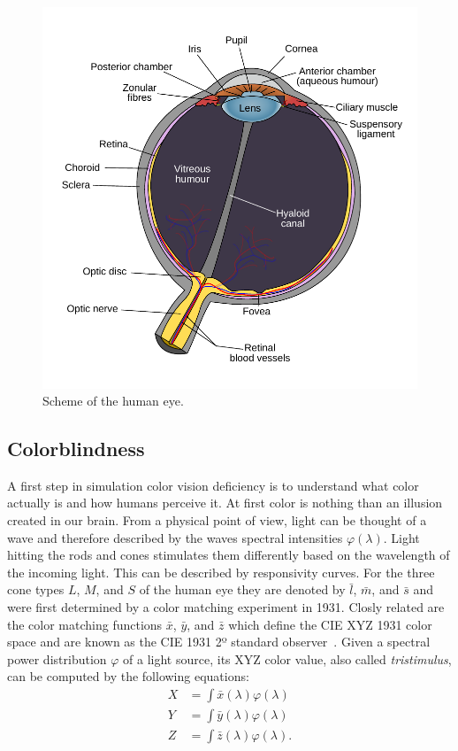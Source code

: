 \documentclass{sig-alternate-05-2015}
\begin{document}
\begin{figure}
    \centering
    \includegraphics[width=\columnwidth]{human_eye_scheme.pdf}
    \caption{Scheme of the human eye.}
    \label{fig:humaneye}
\end{figure}
%
%
\subsection{Colorblindness}
A first step in simulation color vision deficiency is to understand what color actually is and how humans perceive it.
At first color is nothing than an illusion created in our brain.
From a physical point of view, light can be thought of a wave and therefore described by the waves spectral intensities $\varphi(\lambda)$.
Light hitting the rods and cones stimulates them differently based on the wavelength of the incoming light.
This can be described by responsivity curves.
For the three cone types $L$, $M$, and $S$ of the human eye they are denoted by $\bar l$, $\bar m$, and $\bar s$ and were first determined by a color matching experiment in 1931.
Closly related are the color matching functions $\bar x$, $\bar y$, and $\bar z$ which define the CIE XYZ 1931 color space and are known as the CIE 1931 2º standard observer~\cite{cvrl-xyz-web}.
Given a spectral power distribution $\varphi$ of a light source, its XYZ color value, also called \emph{tristimulus}, can be computed by the following equations:
\begin{eqnarray}
    \label{eqn:xyzdef}
    X &= \int\bar x(\lambda) \varphi(\lambda) \\
    Y &= \int\bar y(\lambda) \varphi(\lambda) \\
    Z &= \int\bar z(\lambda) \varphi(\lambda).
\end{eqnarray}
\end{document}

